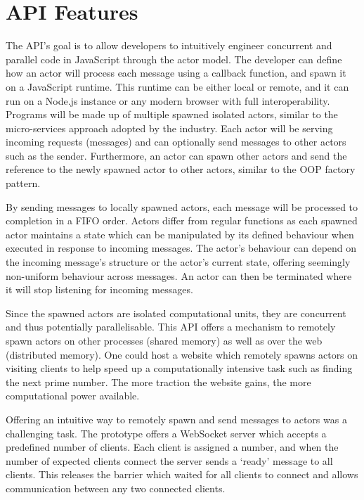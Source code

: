 \documentclass[12pt, a4paper]{report}
\theoremstyle{definition}
\theoremstyle{definition}%
\theoremstyle{definition}%
\theoremstyle{definition}%
\theoremstyle{definition}%
\theoremstyle{definition}%
\begin{document}
\section{API Features}
The API’s goal is to allow developers to intuitively engineer concurrent and parallel code in JavaScript through the actor model. The developer can define how an actor will process each message using a callback function, and spawn it on a JavaScript runtime. This runtime can be either local or remote, and it can run on a Node.js instance or any modern browser with full interoperability. Programs will be made up of multiple spawned isolated actors, similar to the micro-services approach adopted by the industry. Each actor will be serving incoming requests (messages) and can optionally send messages to other actors such as the sender. Furthermore, an actor can spawn other actors and send the reference to the newly spawned actor to other actors, similar to the OOP factory pattern.

By sending messages to locally spawned actors, each message will be processed to completion in a FIFO order. Actors differ from regular functions as each spawned actor maintains a state which can be manipulated by its defined behaviour when executed in response to incoming messages. The actor’s behaviour can depend on the incoming message’s structure or the actor’s current state, offering seemingly non-uniform behaviour across messages. An actor can then be terminated where it will stop listening for incoming messages.

Since the spawned actors are isolated computational units, they are concurrent and thus potentially parallelisable. This API offers a mechanism to remotely spawn actors on other processes (shared memory) as well as over the web (distributed memory). One could host a website which remotely spawns actors on visiting clients to help speed up a computationally intensive task such as finding the next prime number. The more traction the website gains, the more computational power available.

Offering an intuitive way to remotely spawn and send messages to actors was a challenging task. The prototype offers a WebSocket server which accepts a predefined number of clients. Each client is assigned a number, and when the number of expected clients connect the server sends a ‘ready’ message to all clients. This releases the barrier which waited for all clients to connect and allows communication between any two connected clients. 
\end{document}
